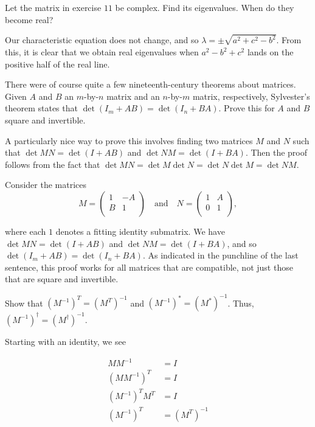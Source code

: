 \documentclass[../group-theory-in-a-nutshell-for-physicists.tex]{subfiles}
\begin{document}
\begin{questions}
\question Let the matrix in exercise $11$ be complex. Find its eigenvalues. When do
they become real?

\begin{solution}
Our characteristic equation does not change, and so
$\lambda = \pm \sqrt{a^{2} + c^{2} - b^{2}}$. From this, it is clear
that we obtain real eigenvalues when $a^{2} - b^{2} + c^{2}$ lands on
the positive half of the real line.
\end{solution}

\question There were of course quite a few nineteenth-century theorems about
matrices. Given $A$ and $B$ an $m$-by-$n$ matrix and an
$n$-by-$m$ matrix, respectively, Sylvester's theorem states that
$\det(I_{m} + AB) = \det(I_{n} + BA)$. Prove this for $A$ and $B$
square and invertible.

\begin{solution}
A particularly nice way to prove this involves finding two matrices
$M$ and $N$ such that $\det MN = \det(I + AB)$ and
$\det NM = \det(I + BA)$. Then the proof follows from the fact that
$\det MN = \det M\det N = \det N\det M = \det NM$.

Consider the matrices
\[M = \begin{pmatrix}
1 & - A \\
B & 1 \\
\end{pmatrix} \quad \text{and} \quad N = \begin{pmatrix}
1 & A \\
0 & 1 \\
\end{pmatrix},
\]

where each $1$ denotes a fitting identity submatrix. We have
$\det MN = \det(I + AB)$ and $\det NM = \det(I + BA)$, and so
$\det(I_{m} + AB) = \det(I_{n} + BA)$. As indicated in the punchline
of the last sentence, this proof works for all matrices that are
compatible, not just those that are square and invertible.
\end{solution}

\question Show that $(M^{- 1})^{T} = (M^{T})^{- 1}$ and
$(M^{- 1})^{*} = (M^{*})^{- 1}$. Thus,
$(M^{- 1})^{\dagger} = (M^{\dagger})^{- 1}$.

\begin{solution}
Starting with an identity, we see

\begin{align*}
MM^{- 1} &= I \\
(MM^{- 1})^{T} &= I \\
(M^{- 1})^{T}M^{T} &= I \\
(M^{- 1})^{T} &= (M^{T})^{- 1}
\end{align*}


\end{solution}
\end{questions}
\end{document}
